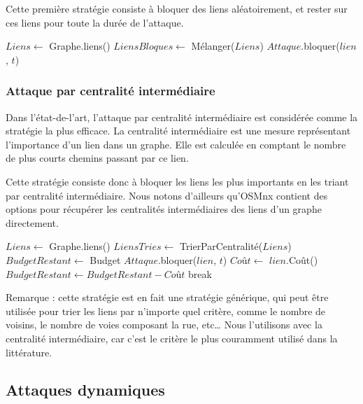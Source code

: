 Cette première stratégie consiste à bloquer des liens aléatoirement, et rester sur ces liens pour toute la durée de l'attaque.
\begin{algorithm}[H]
\caption{Attaque aléatoire statique}
\begin{algorithmic}
\State $Liens \gets$ Graphe.liens()
\State $LiensBloques \gets$ Mélanger($Liens$)
\State $Attaque$.bloquer($lien$, $t$)
\EndFor
\end{algorithmic}
\end{algorithm}

\subsubsection{Attaque par centralité intermédiaire}\label{subsubsec:attaque_centralite_intermediaire}

Dans l'état-de-l'art, l'attaque par centralité intermédiaire est considérée comme la stratégie la plus efficace.
La centralité intermédiaire est une mesure représentant l'importance d'un lien dans un graphe.
Elle est calculée en comptant le nombre de plus courts chemins passant par ce lien.

Cette stratégie consiste donc à bloquer les liens les plus importants en les triant par centralité intermédiaire.
Nous notons d'ailleurs qu'OSMnx contient des options pour récupérer les centralités intermédiaires des liens d'un graphe directement.
\begin{algorithm}[H]
\caption{Attaque par centralité intermédiaire}
\begin{algorithmic}
\State $Liens \gets$ Graphe.liens()
\State $LiensTries \gets$ TrierParCentralité($Liens$)
\State $BudgetRestant \gets$ Budget
\State $Attaque$.bloquer($lien$, $t$)
\State $Coût \gets$ $lien$.Coût()
\State $BudgetRestant \gets BudgetRestant - Coût$
\State break
\EndIf
\EndFor
\EndFor
\end{algorithmic}
\end{algorithm}

Remarque : cette stratégie est en fait une stratégie générique, qui peut être utilisée pour trier les liens par n'importe quel critère, comme le nombre de voisins, le nombre de voies composant la rue, etc\dots
Nous l'utilisons avec la centralité intermédiaire, car c'est le critère le plus couramment utilisé dans la littérature.

\subsection{Attaques dynamiques}\label{subsec:attaques_dynamiques}

